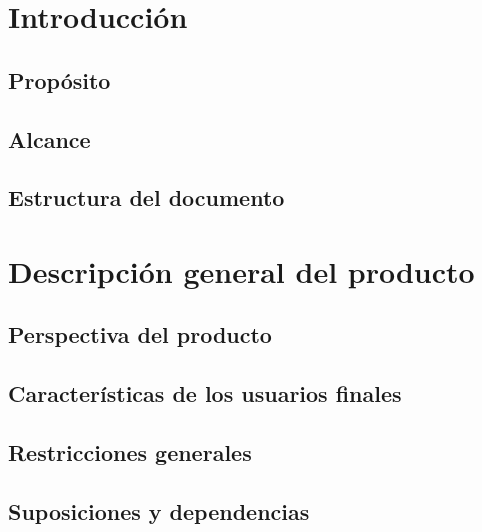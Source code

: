 \section{Introducción}\label{sec:intro}

\subsection{Propósito}\label{ssec:purpose}

\subsection{Alcance}\label{ssec:aim}

% 
\subsection{Estructura del documento}\label{ssec:structure}


\section{Descripción general del producto}\label{sec:description}

\subsection{Perspectiva del producto}\label{ssec:perspective}

\subsection{Características de los usuarios finales}\label{ssec:specs}

\subsection{Restricciones generales}\label{ssec:restrictions}

\subsection{Suposiciones y dependencias}\label{ssec:dependencies}



